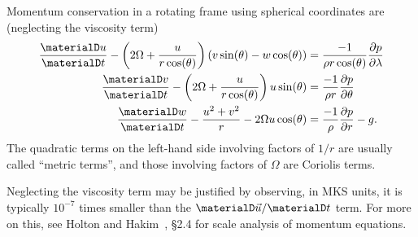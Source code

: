 \begin{prop}
  Momentum conservation in a rotating frame using spherical coordinates
  are (neglecting the viscosity term)
  \begin{subequations}
    \begin{align}
      \frac{\materialD u}{\materialD t} -\left(2\Omega + \frac{u}{r\cos(\theta)}\right)(v\sin(\theta)-w\cos(\theta))
      &= \frac{-1}{\rho r\cos(\theta)}\frac{\partial p}{\partial\lambda}\\
      \frac{\materialD v}{\materialD t} -\left(2\Omega + \frac{u}{r\cos(\theta)}\right)u\sin(\theta)
      &= \frac{-1}{\rho r}\frac{\partial p}{\partial\theta} \\
      \frac{\materialD w}{\materialD t} - \frac{u^{2}+v^{2}}{r} -
      2\Omega u\cos(\theta)
      &= \frac{-1}{\rho}\frac{\partial p}{\partial r}-g.\label{eq:vertical-rotating-momentum-conservation}
    \end{align}
  \end{subequations}
  The quadratic terms on the left-hand side involving factors of $1/r$
  are usually called ``metric terms'', and those involving factors of
  $\Omega$ are Coriolis terms.
\end{prop}

Neglecting the viscosity term may be justified by observing, in MKS
units, it is typically $10^{-7}$ times smaller than the $\materialD\vec{u}/\materialD t$
term. For more on this, see Holton and
Hakim~\cite{holton2013dynamicMeteorology}, \S2.4 for scale analysis of
momentum equations.

